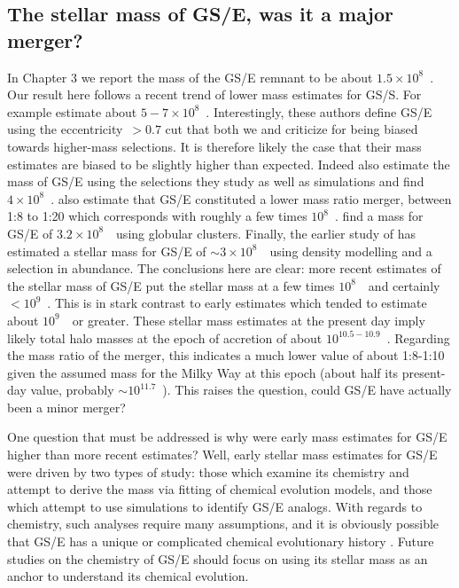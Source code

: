 \subsection{The stellar mass of GS/E, was it a major merger?}

In Chapter 3 we report the mass of the GS/E remnant to be about $1.5\times10^{8}$~\Msun. Our result here follows a recent trend of lower mass estimates for GS/S. For example \textcite{han22} estimate about $5-7\times10^{8}$~\Msun. Interestingly, these authors define GS/E using the eccentricity~$> 0.7$ cut that both we and \textcite{carrillo23} criticize for being biased towards higher-mass selections. It is therefore likely the case that their mass estimates are biased to be slightly higher than expected. Indeed \textcite{carrillo23} also estimate the mass of GS/E using the selections they study as well as simulations and find $4\times10^{8}$~\Msun. \textcite{rey23} also estimate that GS/E constituted a lower mass ratio merger, between 1:8 to 1:20 which corresponds with roughly a few times $10^{8}$~\Msun. \textcite{callingham22} find a mass for GS/E of $3.2\times10^{8}$~\Msun\ using globular clusters. Finally, the earlier study of \textcite{mackereth20} has estimated a stellar mass for GS/E of $\sim 3\times10^{8}$~\Msun\ using density modelling and a selection in abundance. The conclusions here are clear: more recent estimates of the stellar mass of GS/E put the stellar mass at a few times $10^{8}$~\Msun\ and certainly $< 10^{9}$~\Msun. This is in stark contrast to early estimates which tended to estimate about $10^{9}$~\Msun\ or greater. These stellar mass estimates at the present day imply likely total halo masses at the epoch of accretion of about $10^{10.5-10.9}$~\Msun. Regarding the mass ratio of the merger, this indicates a much lower value of about 1:8-1:10 given the assumed mass for the Milky Way at this epoch (about half its present-day value, probably $\sim 10^{11.7}$~\Msun). This raises the question, could GS/E have actually been a minor merger?

One question that must be addressed is why were early mass estimates for GS/E higher than more recent estimates? Well, early stellar mass estimates for GS/E were driven by two types of study: those which examine its chemistry and attempt to derive the mass via fitting of chemical evolution models, and those which attempt to use simulations to identify GS/E analogs. With regards to chemistry, such analyses require many assumptions, and it is obviously possible that GS/E has a unique or complicated chemical evolutionary history \parencite[e.g. as argued by][]{matsuno21,sanders21}. Future studies on the chemistry of GS/E should focus on using its stellar mass as an anchor to understand its chemical evolution. 

